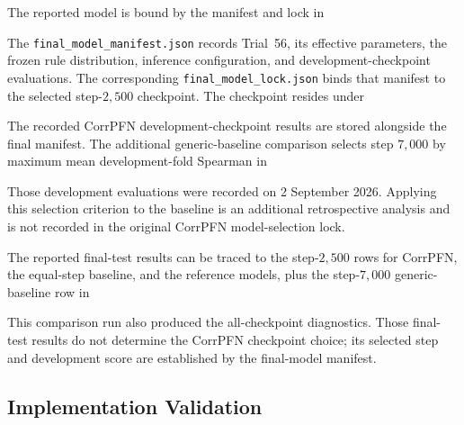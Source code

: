 \documentclass{article}
\begin{document}
The reported model is bound by the manifest and lock in
\begin{quote}
\small\raggedright
{}
\end{quote}
The \texttt{final\_model\_manifest.json} records Trial~56, its effective
parameters, the frozen rule distribution, inference configuration, and
development-checkpoint evaluations. The corresponding
\texttt{final\_model\_lock.json} binds that manifest to the selected
step-\(2{,}500\) checkpoint. The checkpoint resides under
\begin{quote}
\small\raggedright
{}
\end{quote}

The recorded CorrPFN development-checkpoint results are stored alongside the
final manifest. The additional generic-baseline comparison selects step
\(7{,}000\) by maximum mean development-fold Spearman in
\begin{quote}
\small\raggedright
{}
\end{quote}
Those development evaluations were recorded on 2 September 2026. Applying
this selection criterion to the baseline is an additional retrospective
analysis and is not recorded in the original CorrPFN model-selection lock.

The reported final-test results can be traced to the step-\(2{,}500\) rows
for CorrPFN, the equal-step baseline, and the reference models, plus the
step-\(7{,}000\) generic-baseline row in
\begin{quote}
\small\raggedright
{}
\end{quote}
This comparison run also produced the all-checkpoint diagnostics. Those
final-test results do not determine the CorrPFN checkpoint choice; its
selected step and development score are established by the final-model
manifest.

\subsection{Implementation Validation}
\end{document}
